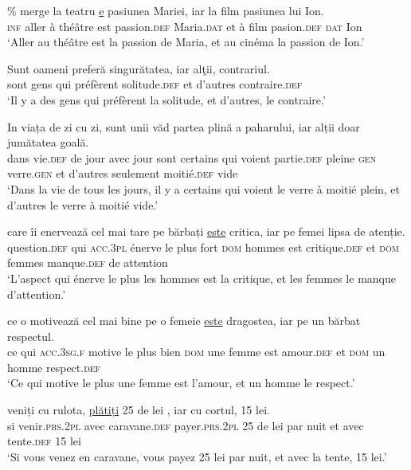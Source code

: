 \ex 
\gll \% merge  la  teatru  \uline{e}  pasiunea  Mariei,  iar  la  film  pasiunea  lui  Ion.\\
\textsc{inf}  aller  à  théâtre  est  passion.\textsc{def}  Maria.\textsc{dat}  et  à  film  pasion.\textsc{def}  \textsc{dat}  Ion\\
\glt ‘Aller au théâtre est la passion de Maria, et au cinéma la passion de Ion.’
\z
\z


\ea \label{ch2:ex219}
\ea
\gll Sunt  oameni   preferă singurătatea,  iar alţii, contrariul.\\
sont  gens  qui  préfèrent  solitude.\textsc{def}  et  d’autres  contraire.\textsc{def}\hspace*{-2mm}\\
\glt ‘Il y a des gens qui préfèrent la solitude, et d’autres, le contraire.’

\ex 
\gll In  viața  de  zi  cu  zi,  sunt  unii    văd  partea  plină a  paharului, iar  alții  doar  jumătatea  goală.\\ 
dans vie.\textsc{def} de jour avec jour sont certains qui voient  partie.\textsc{def} pleine \textsc{gen} verre.\textsc{gen} et d’autres seulement  moitié.\textsc{def} vide\\
\glt ‘Dans la vie de tous les jours, il y a certains qui voient le verre à moitié plein, et d’autres le verre à moitié vide.’

\ex 
\gll {}  care  îi  enervează  cel  mai  tare  pe  bărbați  \uline{este} critica,  iar  pe  femei  lipsa  de  atenție.\\ 
question.\textsc{def}  qui  \textsc{acc.3pl}  énerve  le  plus  fort  \textsc{dom} hommes  est critique.\textsc{def} et \textsc{dom} femmes manque.\textsc{def} de attention\\
\glt ‘L’aspect qui énerve le plus les hommes est la critique, et les femmes le manque d’attention.’

\ex 
\gll {}  ce  o  motivează  cel  mai  bine  pe  o  femeie \uline{este} dragostea,  iar  pe  un  bărbat  respectul.\\
ce  qui  \textsc{acc.3sg.f}  motive  le  plus  bien  \textsc{dom}  une  femme  est amour.\textsc{def}  et  \textsc{dom}  un  homme  respect.\textsc{def}\\
\glt ‘Ce qui motive le plus une femme est l’amour, et un homme le respect.’
\z
\z


\ea \label{ch2:ex220}
\ea  
\gll {}  veniți  cu  rulota,  \uline{plătiți}  25  de  lei    ,  iar cu  cortul,  15  lei.\\  
si  venir.\textsc{prs.2pl}  avec  caravane.\textsc{def}  payer.\textsc{prs.2pl}  25  de  lei  par  nuit  et avec  tente.\textsc{def}  15  lei\\
\glt ‘Si vous venez en caravane, vous payez 25 lei par nuit, et avec la tente, 15 lei.’  

